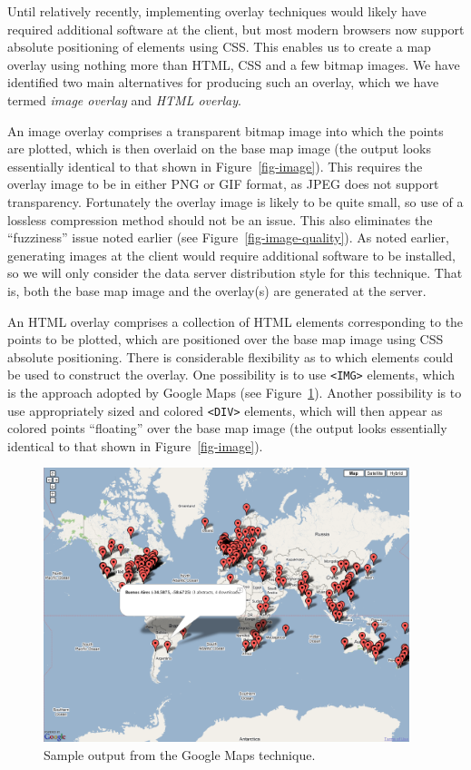 \documentclass[acmtocl,acmnow]{acmtrans2m}
\begin{document}
Until relatively recently, implementing overlay techniques would likely
have required additional software at the client, but most modern
browsers now support absolute positioning of elements using CSS. This
enables us to create a map overlay using nothing more than HTML, CSS and
a few bitmap images. We have identified two main alternatives for
producing such an overlay, which we have termed \emph{image overlay} and
\emph{HTML overlay}.

An image overlay comprises a transparent bitmap image into which the
points are plotted, which is then overlaid on the base map image (the
output looks essentially identical to that shown in
Figure~\ref{fig-image}). This requires the overlay image to be in either
PNG or GIF format, as JPEG does not support transparency. Fortunately
the overlay image is likely to be quite small, so use of a lossless
compression method should not be an issue. This also eliminates the
``fuzziness'' issue noted earlier (see Figure~\ref{fig-image-quality}).
As noted earlier, generating images at the client would require
additional software to be installed, so we will only consider the data
server distribution style for this technique. That is, both the base map
image and the overlay(s) are generated at the server.

An HTML overlay comprises a collection of HTML elements corresponding to
the points to be plotted, which are positioned over the base map image
using CSS absolute positioning. There is considerable flexibility as to
which elements could be used to construct the overlay. One possibility
is to use \verb|<IMG>| elements, which is the approach adopted by Google
Maps (see Figure~\ref{fig-google}). Another possibility is to use
appropriately sized and colored \verb|<DIV>| elements, which will then
appear as colored points ``floating'' over the base map image (the
output looks essentially identical to that shown in
Figure~\ref{fig-image}).


\begin{figure}
	\begin{center}
		\includegraphics[width=0.95\textwidth,keepaspectratio]{GoogleMap-full.png}
	\end{center}
	\caption{Sample output from the Google Maps technique.}
	\label{fig-google}
\end{figure}
\end{document}
